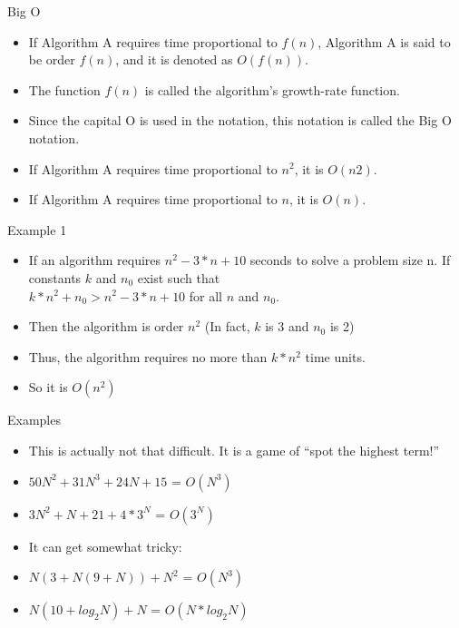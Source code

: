 \documentclass{beamer}
\begin{document}
\begin{frame}{Big O}
\begin{itemize}
\item If  Algorithm A requires time proportional to $f(n)$, Algorithm A is said to be order $f(n)$, and it is denoted as $O(f(n))$.
\item The function $f(n)$ is called the algorithm's growth-rate function.
\item Since the capital O is used in the notation,  this notation is called the Big O notation.
\item If Algorithm A requires time proportional to $n^2$, it is $O(n2)$.
\item If Algorithm A requires time proportional to $n$, it is $O(n)$.
\end{itemize}
\end{frame}

\begin{frame}{Example 1}
\begin{itemize}
\item If an algorithm requires $n^2-3*n+10$ seconds to solve a problem size n. If constants $k$ and $n_0$ exist such that \\
$k*n^2 + n_0 > n^2-3*n+10$ for all $n$ and $n_0$.
\item Then the algorithm is order $n^2$  (In fact, $k$ is 3 and $n_0$ is 2)
\item Thus, the algorithm requires no more than $k*n^2$ time units.
\item So it is $O(n^2)$
\end{itemize}
\end{frame}

\begin{frame}{Examples}
\begin{itemize}
\item This is actually not that difficult.  It is a game of ``spot the highest term!''
\item $50N^2 + 31N^3 + 24N + 15$ = $O(N^3)$ 
\item $3N^2 + N + 21 + 4*3^N$  = $O(3^N)$
\item It can get somewhat tricky:
\item $N(3 + N(9+N)) + N^2$ = $O(N^3)$
\item $N(10 + log_2N) + N$ = $O(N*log_2N)$
\end{itemize}
\end{frame}
\end{document}
